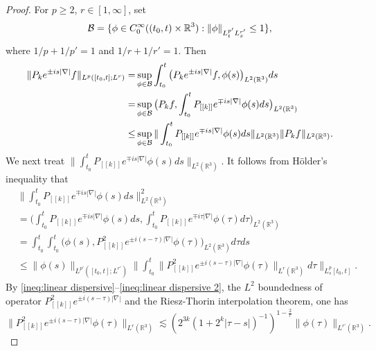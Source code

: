 \documentclass[11pt,twoside]{article}
\def\R{\mathop{\mathbb R\kern 0pt}\nolimits}
\def\f{\frac}
\theoremstyle{plain}
\theoremstyle{definition}
\numberwithin{equation}{section}
\begin{document}
	\begin{proof}
		For $p\ge 2$, $r\in[1,\infty]$, set
		\begin{equation}\label{2.18}
			\mathcal{B}=\{\phi\in C_0^\infty((t_0,t)\times\R^3): \|\phi\|_{L^{p'}_tL^{r'}_x}\le 1\},
		\end{equation}
		where $1/p+1/p'=1$ and $1/r+1/r'=1$. Then
		\begin{equation}\label{2.19}
			\begin{split}
				\|P_k e^{\pm is|\nabla|} f\|_{L^p([t_0,t];L^r)}
				=&\sup_{\phi\in \mathcal{B}}\int_{t_0}^{t}\big(P_k e^{\pm is|\nabla|} f,\phi(s)\big)_{L^2(\R^3)}ds\\
				=&\sup_{\phi\in \mathcal{B}}\big( P_kf,\int_{t_0}^{t}P_{[[k]]} e^{\mp is|\nabla|}\phi(s)ds\big)_{L^2(\R^3)}\\
				\le& \sup_{\phi\in \mathcal{B}}\|\int_{t_0}^{t}P_{[[k]]} e^{\mp is|\nabla|}\phi(s)ds\|_{L^2(\mathbb{R}^3)}\|P_k f\|_{L^2(\mathbb{R}^3)}.
			\end{split}
		\end{equation}
		We next treat $\|\int_{t_0}^{t}P_{[[k]]} e^{\mp is|\nabla|}\phi(s)ds\|_{L^2(\mathbb{R}^3)}$.
It follows from H\"older's inequality  that
		\begin{equation}\label{2.20}
			\begin{split}
				&\|\int_{t_0}^{t}P_{[[k]]} e^{\mp is|\nabla|}\phi(s)ds\|_{L^2(\mathbb{R}^3)}^2\\
				&=\big(
				\int_{t_0}^{t}P_{[[k]]} e^{\mp is|\nabla|}\phi(s)ds,
				\int_{t_0}^{t}P_{[[k]]} e^{\mp i\tau|\nabla|}\phi(\tau)d\tau
				\big)_{L^2(\mathbb{R}^3)}\\
				&=
				\int_{t_0}^{t}\int_{t_0}^{t}\big( \phi(s),
				P_{[[k]]}^2 e^{\pm i(s-\tau)|\nabla|}\phi(\tau)
				\big)_{L^2(\mathbb{R}^3)}d\tau ds\\
				&\le
				\|\phi(s)\|_{L^{p'}([t_0,t];L^{r'})}
				\big\|\int_{t_0}^{t}
				\|P_{[[k]]}^2 e^{\pm i(s-\tau)|\nabla|} \phi(\tau) \|_{L^{r}(\mathbb{R}^3)} d\tau\big\|_{L^p_s[t_0,t]}.
			\end{split}
		\end{equation}
By \eqref{ineq:linear dispersive}--\eqref{ineq:linear dispersive 2}, the $L^2$ boundedness of operator $P_{[[k]]}^2 e^{\pm i(s-\tau)|\nabla|}$ and the Riesz-Thorin interpolation theorem, one has
		\begin{equation}\label{2.21}
			\|P_{[[k]]}^2 e^{\pm i(s-\tau)|\nabla|} \phi(\tau) \|_{L^r(\mathbb{R}^3)}\lesssim (2^{3k}(1 + 2^k |\tau-s|)^{-1})^{1-\f 2r} \|\phi(\tau) \|_{L^{r'}(\mathbb{R}^3)}.

\end{equation}
\end{proof}
\end{document}
